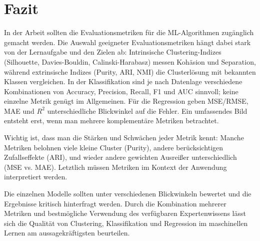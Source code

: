 \chapter{Fazit}
In der Arbeit sollten die Evaluationsmetriken für die ML-Algorithmen zugänglich gemacht werden.
Die Auswahl geeigneter Evaluationsmetriken hängt dabei stark von der Lernaufgabe und
den Zielen ab: Intrinsische Clustering-Indizes (Silhouette, Davies-Bouldin,
Calinski-Harabasz) messen Kohäsion und Separation, während extrinsische Indizes
(Purity, ARI, NMI) die Clusterlösung mit bekannten Klassen vergleichen. In der
Klassifikation sind je nach Datenlage verschiedene Kombinationen von Accuracy,
Precision, Recall, F1 und AUC sinnvoll; keine einzelne Metrik genügt im
Allgemeinen. Für die Regression geben MSE/RMSE, MAE und $R^2$ unterschiedliche
Blickwinkel auf die Fehler. Ein umfassendes Bild entsteht erst, wenn man
mehrere komplementäre Metriken betrachtet.

Wichtig ist, dass man die Stärken
und Schwächen jeder Metrik kennt: Manche Metriken belohnen viele kleine Cluster
(Purity), andere berücksichtigen Zufallseffekte (ARI), und wieder andere
gewichten Ausreißer unterschiedlich (MSE vs. MAE). Letztlich müssen Metriken im Kontext der Anwendung interpretiert werden.

Die einzelnen Modelle sollten unter verschiedenen Blickwinkeln
bewertet und die Ergebnisse kritisch hinterfragt werden. Durch die Kombination
mehrerer Metriken und bestmögliche Verwendung des verfügbaren Expertenwissens
lässt sich die Qualität von Clustering, Klassifikation und Regression im
maschinellen Lernen am aussagekräftigsten beurteilen. 



